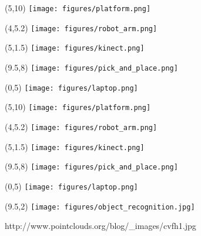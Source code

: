 \documentclass{beamer}
\begin{document}
     \begin{frame}[plain]{}
         \begin{textblock}{5}(5,10)
             \texttt{[image: figures/platform.png]}
            \end{textblock}
            \begin{textblock}{5}(4,5.2)
                \texttt{[image: figures/robot\_arm.png]}
            \end{textblock}
            \begin{textblock}{5}(5,1.5)
                \texttt{[image: figures/kinect.png]}
            \end{textblock}  
                \begin{textblock}{5}(9.5,8)
                    \texttt{[image: figures/pick\_and\_place.png]}
                  \end{textblock}                      
          \begin{textblock}{5}(0,5)
              \texttt{[image: figures/laptop.png]}
            \end{textblock} 
        \end{frame}  


      
     \begin{frame}[plain]{}
         \begin{textblock}{5}(5,10)
             \texttt{[image: figures/platform.png]}
           \end{textblock}
           \begin{textblock}{5}(4,5.2)
               \texttt{[image: figures/robot\_arm.png]}
           \end{textblock}
           \begin{textblock}{5}(5,1.5)
               \texttt{[image: figures/kinect.png]}
           \end{textblock} 
                \begin{textblock}{5}(9.5,8)
                    \texttt{[image: figures/pick\_and\_place.png]}
                 \end{textblock}           
           \begin{textblock}{5}(0,5)
               \texttt{[image: figures/laptop.png]}
           \end{textblock}                      
           \begin{textblock}{5}(9.5,2)
               \texttt{[image: figures/object\_recognition.jpg]}
               
               \tiny{http://www.pointclouds.org/blog/\_images/cvfh1.jpg}
              \end{textblock}       
       \end{frame} 
       
\end{document}
